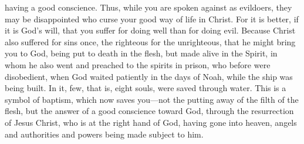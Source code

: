 {having a good conscience. Thus, while you are spoken against as evildoers, they may be disappointed who curse your good way of life in Christ.
For it is better, if it is God’s will, that you suffer for doing well than for doing evil.
Because Christ also suffered for sins once, the righteous for the unrighteous, that he might bring you to God, being put to death in the flesh, but made alive in the Spirit,
in whom he also went and preached to the spirits in prison,
who before were disobedient, when God waited patiently in the days of Noah, while the ship was being built. In it, few, that is, eight souls, were saved through water.
This is a symbol of baptism, which now saves you—not the putting away of the filth of the flesh, but the answer of a good conscience toward God, through the resurrection of Jesus Christ,
who is at the right hand of God, having gone into heaven, angels and authorities and powers being made subject to him.

}
